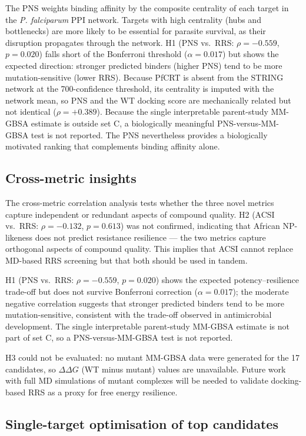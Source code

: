 \documentclass[11pt,a4paper]{article}
\begin{document}
The PNS weights binding affinity by the composite centrality of each target in the \textit{P. falciparum} PPI network. Targets with high centrality (hubs and bottlenecks) are more likely to be essential for parasite survival, as their disruption propagates through the network. H1 (PNS vs.\ RRS: $\rho = -0.559$, $p = 0.020$) falls short of the Bonferroni threshold ($\alpha = 0.017$) but shows the expected direction: stronger predicted binders (higher PNS) tend to be more mutation-sensitive (lower RRS). Because PfCRT is absent from the STRING network at the 700-confidence threshold, its centrality is imputed with the network mean, so PNS and the WT docking score are mechanically related but not identical ($\rho = +0.389$). Because the single interpretable parent-study MM-GBSA estimate is outside set C, a biologically meaningful PNS-versus-MM-GBSA test is not reported. The PNS nevertheless provides a biologically motivated ranking that complements binding affinity alone.

\subsection{Cross-metric insights}

The cross-metric correlation analysis tests whether the three novel metrics capture independent or redundant aspects of compound quality. H2 (ACSI vs.\ RRS: $\rho = -0.132$, $p = 0.613$) was not confirmed, indicating that African NP-likeness does not predict resistance resilience --- the two metrics capture orthogonal aspects of compound quality. This implies that ACSI cannot replace MD-based RRS screening but that both should be used in tandem.

H1 (PNS vs.\ RRS: $\rho = -0.559$, $p = 0.020$) shows the expected potency--resilience trade-off but does not survive Bonferroni correction ($\alpha = 0.017$); the moderate negative correlation suggests that stronger predicted binders tend to be more mutation-sensitive, consistent with the trade-off observed in antimicrobial development. The single interpretable parent-study MM-GBSA estimate is not part of set C, so a PNS-versus-MM-GBSA test is not reported.

H3 could not be evaluated: no mutant MM-GBSA data were generated for the 17 candidates, so $\Delta\Delta G$ (WT minus mutant) values are unavailable. Future work with full MD simulations of mutant complexes will be needed to validate docking-based RRS as a proxy for free energy resilience.

\subsection{Single-target optimisation of top candidates}
\end{document}
